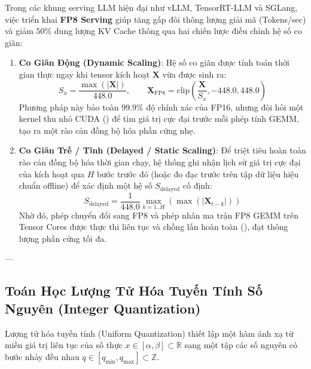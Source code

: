 Trong các khung serving LLM hiện đại như vLLM, TensorRT-LLM và SGLang, việc triển khai \textbf{FP8 Serving} giúp tăng gấp đôi thông lượng giải mã (Tokens/sec) và giảm $50\%$ dung lượng KV Cache thông qua hai chiến lược điều chỉnh hệ số co giãn:
\begin{enumerate}
  \item \textbf{Co Giãn Động (Dynamic Scaling)}:
  Hệ số co giãn được tính toán thời gian thực ngay khi tensor kích hoạt $\mathbf{X}$ vừa được sinh ra:
  \begin{equation}
  S_x = \frac{\max(|\mathbf{X}|)}{448.0}, \qquad \mathbf{X}_{\text{FP8}} = \text{clip}\left(\frac{\mathbf{X}}{S_x}, -448.0, 448.0\right)
  \end{equation}
  Phương pháp này bảo toàn $99.9\%$ độ chính xác của FP16, nhưng đòi hỏi một kernel thu nhỏ CUDA () để tìm giá trị cực đại trước mỗi phép tính GEMM, tạo ra một rào cản đồng bộ hóa phần cứng nhẹ.
  \item \textbf{Co Giãn Trễ / Tĩnh (Delayed / Static Scaling)}:
  Để triệt tiêu hoàn toàn rào cản đồng bộ hóa thời gian chạy, hệ thống ghi nhận lịch sử giá trị cực đại của kích hoạt qua $H$ bước trước đó (hoặc đo đạc trước trên tập dữ liệu hiệu chuẩn offline) để xác định một hệ số $S_{\text{delayed}}$ cố định:
  \begin{equation}
  S_{\text{delayed}} = \frac{1}{448.0} \max_{k=1..H} \left( \max(|\mathbf{X}_{t-k}|) \right)
  \end{equation}
  Nhờ đó, phép chuyển đổi sang FP8 và phép nhân ma trận FP8 GEMM trên Tensor Cores được thực thi liên tục và chồng lấn hoàn toàn (), đạt thông lượng phần cứng tối đa.
\end{enumerate}

---

\subsection{Toán Học Lượng Tử Hóa Tuyến Tính Số Nguyên (Integer Quantization)}

Lượng tử hóa tuyến tính (Uniform Quantization) thiết lập một hàm ánh xạ từ miền giá trị liên tục của số thực $x \in [\alpha, \beta] \subset \mathbb{R}$ sang một tập các số nguyên có bước nhảy đều nhau $q \in [q_{\min}, q_{\max}] \subset \mathbb{Z}$.


